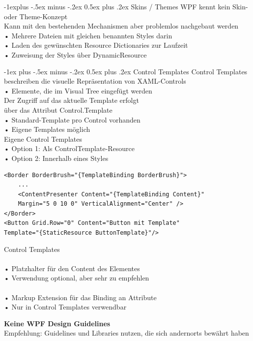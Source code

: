 \documentclass[10pt,landscape,a4paper]{article}
\makeatletter
\renewcommand{\section}{\@startsection{section}{1}{0mm}%
                                {-1ex plus -.5ex minus -.2ex}%
                                {0.5ex plus .2ex}%
                                {\normalfont\large\bfseries}}
\renewcommand{\subsection}{\@startsection{subsection}{2}{0mm}%
                                {-1explus -.5ex minus -.2ex}%
                                {0.5ex plus .2ex}%
                                {\normalfont\small\bfseries}}
\makeatother
\begin{document}
\begin{multicols*}{3}
\subsection{Skins / Themes}
WPF kennt kein Skin- oder Theme-Konzept\\
Kann mit den bestehenden Mechanismen aber problemlos nachgebaut werden\\
• Mehrere Dateien mit gleichen benannten Styles darin\\
• Laden des gewünschten Resource Dictionaries zur Laufzeit\\
• Zuweisung der Styles über DynamicResource


\section{Control Templates}
Control Templates beschreiben die visuelle Repräsentation von XAML-Controls\\
• Elemente, die im Visual Tree eingefügt werden\\
Der Zugriff auf das aktuelle Template erfolgt\\
über das Attribut Control.Template\\
• Standard-Template pro Control vorhanden\\
• Eigene Templates möglich\\
Eigene Control Templates\\
• Option 1: Als ControlTemplate-Resource\\
• Option 2: Innerhalb eines Styles
\begin{verbatim}
<Border BorderBrush="{TemplateBinding BorderBrush}">
    ...
    <ContentPresenter Content="{TemplateBinding Content}"
    Margin="5 0 10 0" VerticalAlignment="Center" />
</Border> 
<Button Grid.Row="0" Content="Button mit Template"
Template="{StaticResource ButtonTemplate}"/>
\end{verbatim}
Control Templates\\
\\
• Platzhalter für den Content des Elementes\\
• Verwendung optional, aber sehr zu empfehlen\\
\\
• Markup Extension für das Binding an Attribute\\
• Nur in Control Templates verwendbar

\textbf{Keine WPF Design Guidelines}\\
Empfehlung: Guidelines und Libraries nutzen, die sich andernorts bewährt haben


\end{multicols*}
\end{document}

